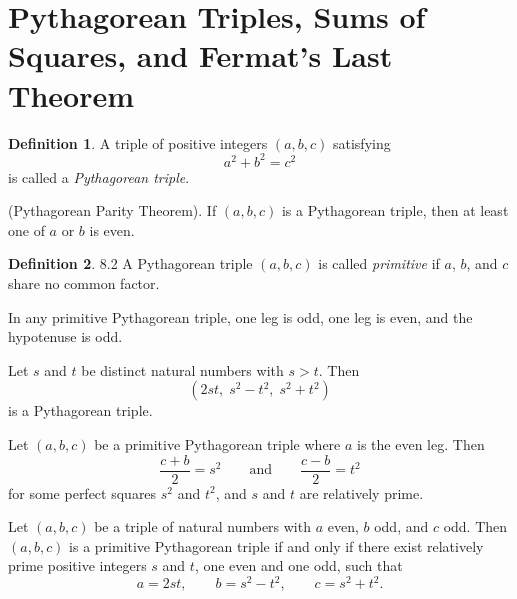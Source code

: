 \documentclass{article}
\theoremstyle{definition}
\newtheorem*{definition*}{Definition}
\newenvironment{manualtheorem}[1]{%
  \renewcommand{\thetheorem}{#1}%
  \theorem%
}{%
  \endtheorem%
}
\begin{document}
\section{Pythagorean Triples, Sums of Squares, and Fermat’s Last Theorem}

\begin{definition*}
	A triple of positive integers $(a,b,c)$ satisfying
	\[
		a^{2} + b^{2} = c^{2}
	\]
	is called a \emph{Pythagorean triple}.
\end{definition*}

\begin{manualtheorem}{8.1}
	(Pythagorean Parity Theorem).
	If $(a,b,c)$ is a Pythagorean triple, then at least one of $a$ or $b$ is even.
\end{manualtheorem}

\begin{definition*}{8.2}
	A Pythagorean triple $(a,b,c)$ is called \emph{primitive} if $a$, $b$, and $c$ share no common factor.

\end{definition*}

\begin{manualtheorem}{8.4}
	In any primitive Pythagorean triple, one leg is odd, one leg is even, and the hypotenuse is odd.
\end{manualtheorem}

\begin{manualtheorem}{8.5}
	Let $s$ and $t$ be distinct natural numbers with $s > t$. Then
	\[
		(2st,\; s^{2} - t^{2},\; s^{2} + t^{2})
	\]
	is a Pythagorean triple.
\end{manualtheorem}

\begin{manualtheorem}{8.6}
	Let $(a,b,c)$ be a primitive Pythagorean triple where $a$ is the even leg.
	Then
	\[
		\frac{c+b}{2} = s^{2}
		\qquad\text{and}\qquad
		\frac{c-b}{2} = t^{2}
	\]
	for some perfect squares $s^{2}$ and $t^{2}$, and $s$ and $t$ are relatively prime.
\end{manualtheorem}

\begin{manualtheorem}{8.7}[Pythagorean Triple Theorem]
	Let $(a,b,c)$ be a triple of natural numbers with $a$ even, $b$ odd, and $c$ odd.
	Then $(a,b,c)$ is a primitive Pythagorean triple if and only if there exist
	relatively prime positive integers $s$ and $t$, one even and one odd, such that
	\[
		a = 2st,\qquad b = s^{2} - t^{2},\qquad c = s^{2} + t^{2}.
	\]
\end{manualtheorem}
\end{document}
